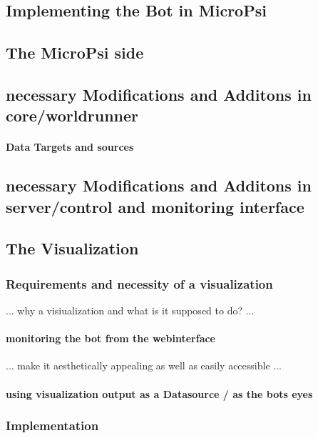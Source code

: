 \subsection{Implementing the Bot in MicroPsi}


\subsection{The MicroPsi side}

\subsection{necessary Modifications and Additons in core/worldrunner}

\paragraph{Data Targets and sources}

\subsection{necessary Modifications and Additons in server/control and monitoring interface}

\subsection{The Visualization}

\subsubsection{Requirements and necessity of a visualization}
... why a visiualization and what is it supposed to do? ...

\paragraph{monitoring the bot from the webinterface}
... make it aesthetically appealing as well as easily accessible ...

\paragraph{using visualization output as a Datasource / as the bots eyes}

\subsubsection{Implementation}

